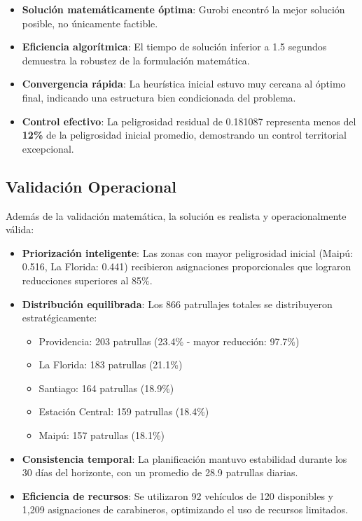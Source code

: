 \begin{itemize}
    \item \textbf{Solución matemáticamente óptima}: Gurobi encontró la mejor solución posible, no únicamente factible.
    
    \item \textbf{Eficiencia algorítmica}: El tiempo de solución inferior a 1.5 segundos demuestra la robustez de la formulación matemática.
    
    \item \textbf{Convergencia rápida}: La heurística inicial estuvo muy cercana al óptimo final, indicando una estructura bien condicionada del problema.
    
    \item \textbf{Control efectivo}: La peligrosidad residual de 0.181087 representa menos del \textbf{12\%} de la peligrosidad inicial promedio, demostrando un control territorial excepcional.
\end{itemize}

\subsection{Validación Operacional}

Además de la validación matemática, la solución es realista y operacionalmente válida:

\begin{itemize}
    \item \textbf{Priorización inteligente}: Las zonas con mayor peligrosidad inicial (Maipú: 0.516, La Florida: 0.441) recibieron asignaciones proporcionales que lograron reducciones superiores al 85\%.
    
    \item \textbf{Distribución equilibrada}: Los 866 patrullajes totales se distribuyeron estratégicamente:
    \begin{itemize}
        \item Providencia: 203 patrullas (23.4\% - mayor reducción: 97.7\%)
        \item La Florida: 183 patrullas (21.1\%)
        \item Santiago: 164 patrullas (18.9\%)
        \item Estación Central: 159 patrullas (18.4\%)
        \item Maipú: 157 patrullas (18.1\%)
    \end{itemize}
    
    \item \textbf{Consistencia temporal}: La planificación mantuvo estabilidad durante los 30 días del horizonte, con un promedio de 28.9 patrullas diarias.
    
    \item \textbf{Eficiencia de recursos}: Se utilizaron 92 vehículos de 120 disponibles y 1,209 asignaciones de carabineros, optimizando el uso de recursos limitados.
\end{itemize}

